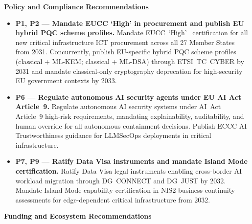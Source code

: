 \documentclass{ieeeaccess}
\begin{document}
\textbf{Policy and Compliance Recommendations}

\begin{itemize}

    \item \textbf{P1, P2 --- Mandate EUCC `High' in procurement and
    publish EU hybrid PQC scheme profiles.}
    Mandate EUCC~`High'~\cite{eucc} certification for all new critical
    infrastructure ICT procurement across all 27 Member States from
    2031. Concurrently, publish EU-specific hybrid PQC scheme profiles
    (classical + ML-KEM; classical + ML-DSA) through ETSI~TC~CYBER by
    2031 and mandate classical-only cryptography deprecation for
    high-security EU government contexts by 2033.

    \item \textbf{P6 --- Regulate autonomous AI security agents under
    EU AI Act Article~9.}
    Regulate autonomous AI security systems under
    AI~Act~\cite{aiact} Article~9 high-risk requirements, mandating
    explainability, auditability, and human override for all autonomous
    containment decisions. Publish ECCC AI Trustworthiness guidance
    for LLMSecOps deployments in critical infrastructure.

    \item \textbf{P7, P9 --- Ratify Data Visa instruments and mandate
    Island Mode certification.}
    Ratify Data Visa legal instruments enabling cross-border AI
    workload migration through DG~CONNECT and DG~JUST by 2032.
    Mandate Island Mode capability certification in NIS2 business
    continuity assessments for edge-dependent critical infrastructure
    from 2032.

\end{itemize}

\textbf{Funding and Ecosystem Recommendations}
\end{document}
